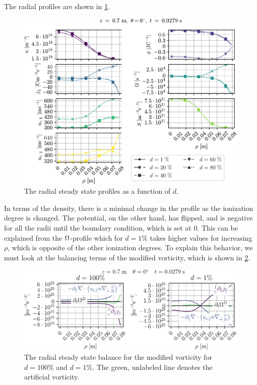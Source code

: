 The radial profiles are shown in \cref{fig:nnScanRad}.
%
\begin{figure}[htb]
    \centering
    \includegraphics{fig/results/neutral/nnScanRad}
    \caption{The radial steady state profiles as a function of $d$.}
    \label{fig:nnScanRad}
\end{figure}
%
In terms of the density, there is a minimal change in the profile as the ionization degree is changed.
The potential, on the other hand, has flipped, and is negative for all the radii until the boundary condition, which is set at $0$.
This can be explained from the $\Omega$-profile which for $d=1\%$ takes higher values for increasing $\rho$, which is opposite of the other ionization degrees.
To explain this behavior, we must look at the balancing terms of the modified vorticity, which is shown in \cref{fig:nnScanVortDRad}.
%
\begin{figure}[h!]
    \centering
    \includegraphics{fig/results/neutral/vortDBalanceNnCompareRad}
    \caption{The radial steady state balance for the modified vorticity for $d=100\%$ and $d=1\%$.
        The green, unlabeled line denotes the artificial vorticity.
    }
    \label{fig:nnScanVortDRad}
\end{figure}
